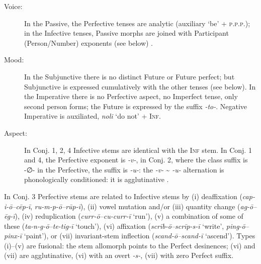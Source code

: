 \documentclass[output=paper, colorlinks,citecolor=brown]{langsci/langscibook}
\begin{document}
\begin{description}
\item[Voice:] In the Passive, the Perfective tenses are analytic (auxiliary ‘be' + \textsc{p.p.p.}); in the Infective tenses, Passive morphs are joined with Participant (Person\slash Number) exponents (see below) . 

\item[Mood:] In the Subjunctive there is no distinct Future or Future perfect;  but Subjunctive is expressed cumulatively with the other tenses (see below). In the Imperative there is no Perfective aspect, no Imperfect tense, only second person forms; the Future is expressed by the suffix \textit{-to-}. Negative Imperative is auxiliated, \textit{noli} ‘do not' + \textsc{Inf}.

\item[Aspect:] In Conj. 1, 2, 4 Infective stems are identical with the \textsc{Inf} stem. In Conj. 1 and 4, the Perfective exponent is \textit{-v-}, in Conj. 2, where the class suffix is -∅- in the Perfective, the suffix is \textit{-u-}: the \textit{-v-} {\textasciitilde} \textit{-u-} alternation is phonologically conditioned: it is agglutinative . 
\end{description}

In Conj. 3 Perfective stems are related to Infective stems by (i) deaffixation (\textit{cap-i-ō–cēp-ī}, \textit{ru-m-p-ō–rūp-ī}), (ii) vowel mutation and/or (iii) quantity change (\textit{ag-ō–ēg-ī}), (iv) reduplication (\textit{curr-ō–cu-curr-ī} `run'), (v) a combination of some of these (\textit{ta-n-g-ō–te-tig-ī} `touch'), (vi) affixation (\textit{scrīb-ō–scrīp-s-ī} `write', \textit{ping-ō–pinx-ī} `paint'), or (vii) invariant-stem inflection (\textit{scand-ō–scand-ī} `ascend'). Types (i)–(v) are fusional: the stem allomorph points to the Perfect desinences; (vi) and (vii) are agglutinative, (vi) with an overt \textit{-s-}, (vii) with zero Perfect suffix. 
\end{document}
